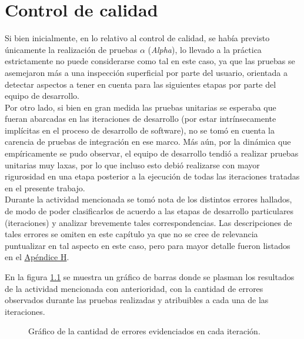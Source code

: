 \documentclass[a4paper, 12pt,twoside]{report}  %
\numberwithin{equation}{subsection} %
\begin{document}
\chapter{Control de calidad}
\label{Control de calidad}
Si bien inicialmente, en lo relativo al control de calidad, se había previsto únicamente la realización de pruebas \begin{math}\alpha\end{math} (\textit{Alpha}), lo llevado a la práctica estrictamente no puede considerarse como tal en este caso, ya que las pruebas se asemejaron más a una inspección superficial por parte del usuario, orientada a detectar aspectos a tener en cuenta para las siguientes etapas por parte del equipo de desarrollo.\\
\indent Por otro lado, si bien en gran medida las pruebas unitarias se esperaba que fueran abarcadas en las iteraciones de desarrollo (por estar intrínsecamente implícitas en el proceso de desarrollo de software), no se tomó en cuenta la carencia de pruebas de integración en ese marco. Más aún, por la dinámica que empíricamente se pudo observar, el equipo de desarrollo tendió a realizar pruebas unitarias muy laxas, por lo que incluso esto debió realizarse con mayor rigurosidad en una etapa posterior a la ejecución de todas las iteraciones tratadas en el presente trabajo.\\
\indent Durante la actividad mencionada se tomó nota de los distintos errores hallados, de modo de poder clasificarlos de acuerdo a las etapas de desarrollo particulares (iteraciones) y analizar brevemente tales correspondencias. Las descripciones de tales errores se omiten en este capítulo ya que no se cree de relevancia puntualizar en tal aspecto en este caso, pero para mayor detalle fueron listados en el \hyperlink{apendice_h}{Apéndice H}.

\indent En la figura \ref{grafico_errores_iteracion} se muestra un gráfico de barras donde se plasman los resultados de la actividad mencionada con anterioridad, con la cantidad de errores observados durante las pruebas realizadas y atribuibles a cada una de las iteraciones.

\begin{figure}[H]
	\centering
	\caption{Gráfico de la cantidad de errores evidenciados en cada iteración.}
	\label{grafico_errores_iteracion}
\end{figure}
\end{document}
